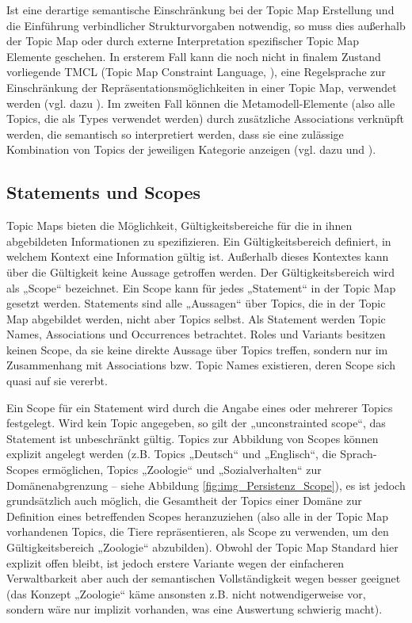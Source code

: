 Ist eine derartige semantische Einschränkung bei der Topic Map Erstellung und die Einführung verbindlicher Strukturvorgaben notwendig, so muss dies außerhalb der Topic Map oder durch externe Interpretation spezifischer Topic Map Elemente geschehen. In ersterem Fall kann die noch nicht in finalem Zustand vorliegende TMCL (Topic Map Constraint Language, \citep{TMCL08}), eine Regelsprache zur Einschränkung der Repräsentationsmöglichkeiten in einer Topic Map, verwendet werden (vgl. dazu \cite{Mayrhauser10}). Im zweiten Fall können die Metamodell-Elemente (also alle Topics, die als Types verwendet werden) durch zusätzliche Associations verknüpft werden, die semantisch so interpretiert werden, dass sie eine zulässige Kombination von Topics der jeweiligen Kategorie anzeigen (vgl. dazu \citep{Oppl07} und \citep{Neubauer08}). 


\subsection{Statements und Scopes} %
\label{sub:scopes}

Topic Maps bieten die Möglichkeit, Gültigkeitsbereiche für die in ihnen abgebildeten Informationen zu spezifizieren. Ein Gültigkeitsbereich definiert, in welchem Kontext eine Information gültig ist. Außerhalb dieses Kontextes kann über die Gültigkeit keine Aussage getroffen werden. Der Gültigkeitsbereich wird als „Scope“ bezeichnet. Ein Scope kann für jedes „Statement“ in der Topic Map gesetzt werden. Statements sind alle „Aussagen“ über Topics, die in der Topic Map abgebildet werden, nicht aber Topics selbst. Als Statement werden Topic Names, Associations und Occurrences betrachtet. Roles und Variants besitzen keinen Scope, da sie keine direkte Aussage über Topics treffen, sondern nur im Zusammenhang mit Associations bzw. Topic Names existieren, deren Scope sich quasi auf sie vererbt.

Ein Scope für ein Statement wird durch die Angabe eines oder mehrerer Topics festgelegt. Wird kein Topic angegeben, so gilt der „unconstrainted scope“, das Statement ist unbeschränkt gültig. Topics zur Abbildung von Scopes können explizit angelegt werden (z.B. Topics „Deutsch“ und „Englisch“, die Sprach-Scopes ermöglichen, Topics „Zoologie“ und „Sozialverhalten“ zur Domänenabgrenzung -- siehe Abbildung \ref{fig:img_Persistenz_Scope}), es ist jedoch grundsätzlich auch möglich, die Gesamtheit der Topics einer Domäne zur Definition eines betreffenden Scopes heranzuziehen (also alle in der Topic Map vorhandenen Topics, die Tiere repräsentieren, als Scope zu verwenden, um den Gültigkeitsbereich „Zoologie“ abzubilden). Obwohl der Topic Map Standard hier explizit offen bleibt, ist jedoch erstere Variante wegen der einfacheren Verwaltbarkeit aber auch der semantischen Vollständigkeit wegen besser geeignet (das Konzept „Zoologie“ käme ansonsten z.B. nicht notwendigerweise vor, sondern wäre nur implizit vorhanden, was eine Auswertung schwierig macht).

